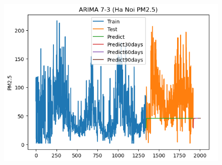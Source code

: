 \begin{figure}[H]
\begin{minipage}{0.15\textwidth}
    \includegraphics[width=1\textwidth]{img/final/ARIMA/90D/ARIMA_7_3_HN.png}
    \end{minipage}
    \hfill


\end{figure}
